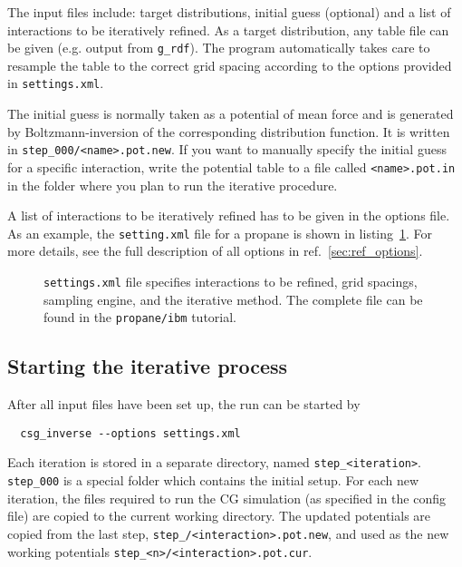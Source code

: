 The input files include: target distributions, initial guess (optional) and a list of interactions to be iteratively refined. As a target distribution, any table file can be given (e.g. \gromacs output from \texttt{g\_rdf}). The program automatically takes care to resample the table to the correct grid spacing according to the options provided in \texttt{settings.xml}.

The initial guess is normally taken as a potential of mean force and is generated by Boltzmann-inversion of the corresponding distribution function. It is written in \texttt{step\_000/<name>.pot.new}. If you want to manually specify the initial guess for a specific interaction, write the potential table to a file called \texttt{<name>.pot.in} in the folder where you plan to run the iterative procedure.

A list of interactions to be iteratively refined has to be given in the options file. As an example, the \texttt{setting.xml} file for a propane is shown in listing~\ref{list:settings}. For more details,  see the full description of all options in ref.~\ref{sec:ref_options}.
\begin{figure}
\centering
\framebox{[width=7cm]

}
\caption{\texttt{settings.xml} file specifies interactions to be refined, grid spacings, sampling engine, and the iterative method. The complete file can be found in the \texttt{propane/ibm} tutorial. 
\label{list:settings}
}
\end{figure}

\subsection{Starting the iterative process}
\label{sec:starting_iterative_process}
After all input files have been set up, the run can be started by
\begin{verbatim}
  csg_inverse --options settings.xml
\end{verbatim}

Each iteration is stored in a separate directory, named \texttt{step\_<iteration>}. \texttt{step\_000} is a special folder which contains the initial setup. For each new iteration, the files required to run the CG simulation (as specified in the config file) are copied to the current working directory. The updated potentials  are copied from the last step, \texttt{step\_<n-1>/<interaction>.pot.new}, and used as the new working potentials \texttt{step\_<n>/<interaction>.pot.cur}.

